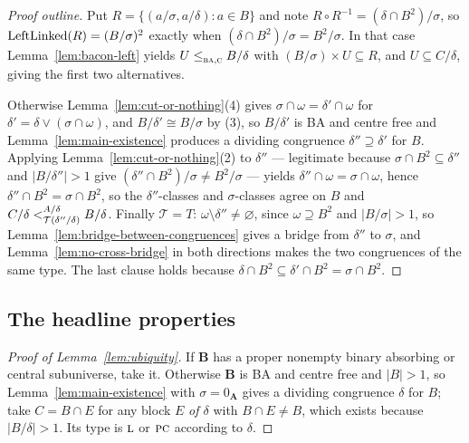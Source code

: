 \begin{proof}[Proof outline]
Put $R=\{(a/\sigma,a/\delta):a\in B\}$ and note
$R\circ R^{-1}=(\delta\cap B^{2})/\sigma$, so
$\LeftLinked(R)=(B/\sigma)^{2}$ exactly when
$(\delta\cap B^{2})/\sigma=B^{2}/\sigma$. In that case
Lemma~\ref{lem:bacon-left} yields $U\subte{\TBA,\TC}B/\delta$ with
$(B/\sigma)\times U\subseteq R$, and $U\subseteq C/\delta$, giving the first two
alternatives.

Otherwise Lemma~\ref{lem:cut-or-nothing}(4) gives
$\sigma\cap\omega=\delta'\cap\omega$ for $\delta'=\delta\vee(\sigma\cap\omega)$,
and $B/\delta'\cong B/\sigma$ by (3), so $B/\delta'$ is BA and centre free and
Lemma~\ref{lem:main-existence} produces a dividing congruence
$\delta''\supseteq\delta'$ for $B$. Applying
Lemma~\ref{lem:cut-or-nothing}(2) to $\delta''$ --- legitimate because
$\sigma\cap B^{2}\subseteq\delta''$ and $|B/\delta''|>1$ give
$(\delta''\cap B^{2})/\sigma\neq B^{2}/\sigma$ --- yields
$\delta''\cap\omega=\sigma\cap\omega$, hence $\delta''\cap B^{2}=\sigma\cap
B^{2}$, so the $\delta''$-classes and $\sigma$-classes agree on $B$ and
$C/\delta\subt[A/\delta]{\mathcal T(\delta''/\delta)}B/\delta$. Finally
$\mathcal T=T$: $\omega\setminus\delta''\neq\varnothing$, since
$\omega\supseteq B^{2}$ and $|B/\sigma|>1$, so
Lemma~\ref{lem:bridge-between-congruences} gives a bridge from $\delta''$ to
$\sigma$, and Lemma~\ref{lem:no-cross-bridge} in both directions makes the two
congruences of the same type. The last clause holds because
$\delta\cap B^{2}\subseteq\delta'\cap B^{2}=\sigma\cap B^{2}$.
\end{proof}

\subsection{The headline properties}\label{sec:headline}

\begin{proof}[Proof of Lemma~\ref{lem:ubiquity}]
If $\mathbf B$ has a proper nonempty binary absorbing or central subuniverse,
take it. Otherwise $\mathbf B$ is BA and centre free and $|B|>1$, so
Lemma~\ref{lem:main-existence} with $\sigma=0_{\mathbf A}$ gives a dividing
congruence $\delta$ for $B$; take $C=B\cap E$ for any block $E$ \emph{of
$\delta$} with $B\cap E\neq B$, which exists because $|B/\delta|>1$. Its type is
$\TL$ or $\TPC$ according to $\delta$.
\end{proof}

